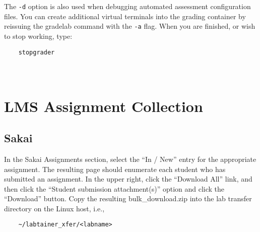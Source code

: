 \documentclass[12pt]{article}
\begin{document}
\noindent The {\tt -d} option is also used when debugging automated assessment configuration
files.  You can create additional virtual terminals into the grading container by reissuing
the gradelab command with the {\tt -a} flag.  When you are finished, or wish to stop working, type:
\begin{verbatim}
    stopgrader
\end{verbatim}

\newpage
\appendix
\section{\\LMS Assignment Collection}
\label{lms collection}
\subsection{Sakai}
In the Sakai Assignments section, select the ``In / New'' entry for the appropriate assignment.
The resulting page should enumerate each student who has submitted an assignment.  In the upper right,
click the ``Download All'' link, and then click the ``Student submission attachment(s)'' option and
click the ``Download'' button.  Copy the resulting bulk\_download.zip into the lab transfer directory 
on the Linux host, i.e.,
\begin{verbatim}
    ~/labtainer_xfer/<labname>
\end{verbatim}
\end{document}
